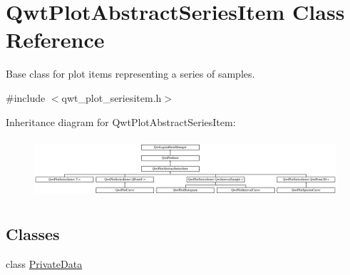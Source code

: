 \hypertarget{class_qwt_plot_abstract_series_item}{\section{Qwt\-Plot\-Abstract\-Series\-Item Class Reference}
\label{class_qwt_plot_abstract_series_item}
}


Base class for plot items representing a series of samples.  




{\ttfamily \#include $<$qwt\-\_\-plot\-\_\-seriesitem.\-h$>$}

Inheritance diagram for Qwt\-Plot\-Abstract\-Series\-Item\-:\begin{figure}[H]
\begin{center}
\leavevmode
\includegraphics[height=2.240000cm]{class_qwt_plot_abstract_series_item}
\end{center}
\end{figure}
\subsection*{Classes}
\begin{DoxyCompactItemize}
\item 
class \hyperlink{class_qwt_plot_abstract_series_item_1_1_private_data}{Private\-Data}
\end{DoxyCompactItemize}
